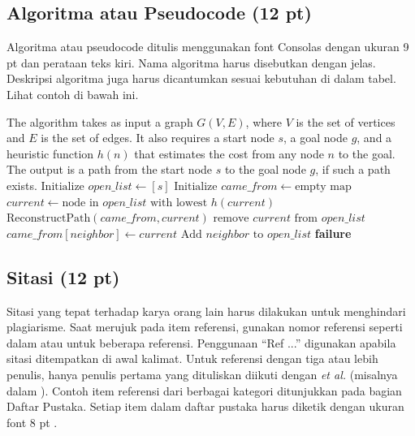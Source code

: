 \documentclass[10pt,a4paper]{article}
\begin{document}
\subsection{Algoritma atau Pseudocode (12 pt)}

Algoritma atau pseudocode ditulis menggunakan font Consolas dengan ukuran 9 pt dan perataan teks kiri. Nama algoritma harus disebutkan dengan jelas. Deskripsi algoritma juga harus dicantumkan sesuai kebutuhan di dalam tabel. Lihat contoh di bawah ini.

\begin{algorithm}[H]
\caption{Greedy search algorithm (10 pt)}
\label{alg:greedy}
\fontsize{9pt}{11pt}\selectfont
\begin{algorithmic}[1]
\Require The algorithm takes as input a graph $G(V,E)$, where $V$ is the set of vertices and $E$ is the set of edges. It also requires a start node $s$, a goal node $g$, and a heuristic function $h(n)$ that estimates the cost from any node $n$ to the goal. The output is a path from the start node $s$ to the goal node $g$, if such a path exists.
\State $\text{Initialize } open\_list \leftarrow [s]$
\State $\text{Initialize } came\_from \leftarrow \text{empty map}$
    \State $current \leftarrow \text{node in } open\_list \text{ with lowest } h(current)$
        \State \Return $\text{ReconstructPath}(came\_from, current)$
    \EndIf
    \State $\text{remove } current \text{ from } open\_list$
            \State $came\_from[neighbor] \leftarrow current$
            \State $\text{Add } neighbor \text{ to } open\_list$
        \EndIf
    \EndFor
\EndWhile
\State \Return \textbf{failure}
\end{algorithmic}
\end{algorithm}

\subsection{Sitasi (12 pt)}

Sitasi yang tepat terhadap karya orang lain harus dilakukan untuk menghindari plagiarisme. Saat merujuk pada item referensi, gunakan nomor referensi seperti dalam \cite{nallaperuma2019online} atau \cite{schulz2019advanced} untuk beberapa referensi. Penggunaan ``Ref \cite{shang2019data} ...'' digunakan apabila sitasi ditempatkan di awal kalimat. Untuk referensi dengan tiga atau lebih penulis, hanya penulis pertama yang dituliskan diikuti dengan \textit{et al.} (misalnya dalam \cite{yu2019clinical}). Contoh item referensi dari berbagai kategori ditunjukkan pada bagian Daftar Pustaka. Setiap item dalam daftar pustaka harus diketik dengan ukuran font 8 pt \cite{huang2019queuing, xu2019internet, aqib2019smarter, leonelli2020data, stylos2019big, song2017tensor}.
\end{document}

